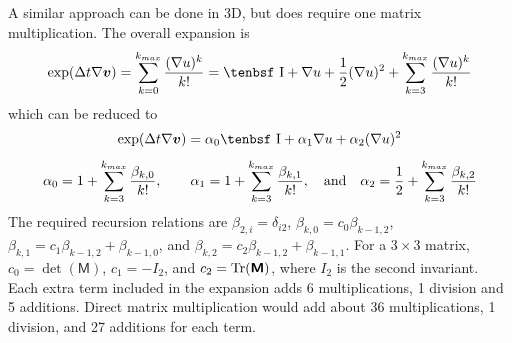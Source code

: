 \documentclass[11pt]{book}
\renewcommand{\vec}[1]{\boldsymbol{#1}}
\newcommand{\tens}[1]{\boldsymbol{\mathsf{#1}}}
\def\I{\hbox{\tenbsf I}}
\begin{document}
A similar approach can be done in 3D, but does require one matrix multiplication. The overall expansion is
\begin{equation}
    \exp(\Delta t \nabla\vec v) = \sum_{k=0}^{k_{max}} {(\nabla u)^k \over k!} 
            = \I + \nabla u + {1\over 2}(\nabla u)^2 + \sum_{k=3}^{k_{max}} {(\nabla u)^k \over k!}
\end{equation}
which can be reduced to
\begin{equation}
    \exp(\Delta t \nabla\vec v) = \alpha_0\I + \alpha_1\nabla u + \alpha_2(\nabla u)^2
\end{equation}
\begin{equation}
      \alpha_0 = 1 + \sum_{k=3}^{k_{max}} {\beta_{k,0}\over k!}, \qquad
      \alpha_1 = 1 + \sum_{k=3}^{k_{max}} {\beta_{k,1}\over k!}, \quad {\rm and} \quad
      \alpha_2 = {1\over 2} + \sum_{k=3}^{k_{max}} {\beta_{k,2}\over k!}
\end{equation}
The required recursion relations are $\beta_{2,i} = \delta_{i2}$, $\beta_{k,0}=c_0\beta_{k-1,2}$, $\beta_{k,1}=c_1\beta_{k-1,2} + \beta_{k-1,0}$, and $\beta_{k,2}=c_2\beta_{k-1,2} + \beta_{k-1,1}$. For a $3\times3$ matrix, $c_0 = \det(\tens M)$, $c_1 = -I_2$, and $c_2 = {\rm Tr}(\tens M)$, where $I_2$ is the second invariant. Each extra term included in the expansion adds 6 multiplications, 1 division and 5 additions. Direct matrix multiplication would add about 36 multiplications, 1 division, and 27 additions for each term.
\end{document}

